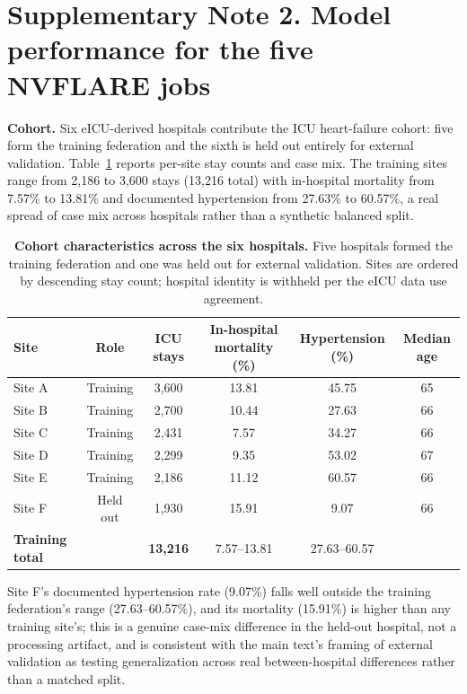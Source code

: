 \documentclass[10pt,a4paper]{article}
\begin{document}
\section{Supplementary Note 2. Model performance for the five NVFLARE jobs}

\textbf{Cohort.} Six eICU-derived hospitals contribute the ICU heart-failure cohort:
five form the training federation and the sixth is held out entirely for external
validation. Table~\ref{tab:cohort} reports per-site stay counts and case mix. The
training sites range from 2,186 to 3,600 stays (13,216 total) with in-hospital
mortality from 7.57\% to 13.81\% and documented hypertension from 27.63\% to 60.57\%,
a real spread of case mix across hospitals rather than a synthetic balanced split.

\begin{table}[h]
\centering
\caption{\textbf{Cohort characteristics across the six hospitals.} Five hospitals
formed the training federation and one was held out for external validation. Sites
are ordered by descending stay count; hospital identity is withheld per the eICU data
use agreement.}
\label{tab:cohort}
\footnotesize
\begin{tabular}{@{}lccccc@{}}
\toprule
\textbf{Site} & \textbf{Role} & \textbf{ICU stays} & \textbf{In-hospital mortality (\%)} & \textbf{Hypertension (\%)} & \textbf{Median age}\\
\midrule
Site A & Training & 3,600 & 13.81 & 45.75 & 65\\
Site B & Training & 2,700 & 10.44 & 27.63 & 66\\
Site C & Training & 2,431 & 7.57 & 34.27 & 66\\
Site D & Training & 2,299 & 9.35 & 53.02 & 67\\
Site E & Training & 2,186 & 11.12 & 60.57 & 66\\
Site F & Held out & 1,930 & 15.91 & 9.07 & 66\\
\midrule
\textbf{Training total} & & \textbf{13,216} & 7.57--13.81 & 27.63--60.57 & \\
\bottomrule
\end{tabular}
\end{table}

Site F's documented hypertension rate (9.07\%) falls well outside the training
federation's range (27.63--60.57\%), and its mortality (15.91\%) is higher than any
training site's; this is a genuine case-mix difference in the held-out hospital, not a
processing artifact, and is consistent with the main text's framing of external
validation as testing generalization across real between-hospital differences rather
than a matched split.
\end{document}
